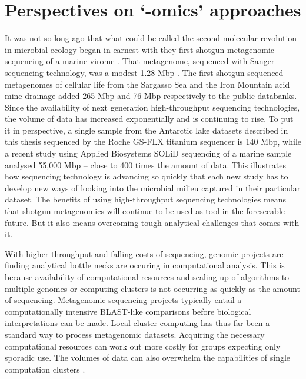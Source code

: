 \section{Perspectives on `-omics' approaches }
It was not so long ago that what could be called the second molecular revolution in microbial ecology began in earnest with they first shotgun metagenomic sequencing of a marine virome \cite{Breitbart2002}.
That metagenome, sequenced with Sanger sequencing technology, was a modest 1.28 Mbp \cite{Breitbart2002}.
The first shotgun sequenced metagenomes of cellular life from the Sargasso Sea \cite{Venter2004} and the Iron Mountain acid mine drainage \cite{Tyson2004} added 265 Mbp and 76 Mbp respectively to the public databanks.
Since the availability of next generation high-throughput sequencing technologies, the volume of data has increased exponentially and is continuing to rise.
To put it in perspective, a single sample from the Antarctic lake datasets described in this thesis sequenced by the Roche GS-FLX titanium sequencer is 140 Mbp, while a recent study using Applied Biosystems SOLiD sequencing of a marine sample \cite{Iverson2012} analysed 55,000 Mbp -- close to 400 times the amount of data.
This illustrates how sequencing technology is advancing so quickly that each new study has to develop new ways of looking into the microbial milieu captured in their particular dataset.
The benefits of using high-throughput sequencing technologies means that shotgun metagenomics will continue to be used as tool in the foreseeable future.
But it also means overcoming tough analytical challenges that comes with it.

With higher throughput and falling costs of sequencing, genomic projects are finding analytical bottle necks are occuring in computational analysis.
This is because availability of computational resources and scaling-up of algorithms to multiple genomes or computing clusters is not occurring as quickly as the amount of sequencing.
Metagenomic sequencing projects typically entail a computationally intensive \acs{BLAST}-like comparisons before biological interpretations can be made.
Local cluster computing has thus far been a standard way to process metagenomic datasets. 
Acquiring the necessary computational resources can work out more costly for groups expecting only sporadic use.
The volumes of data can also overwhelm the capabilities of single computation clusters \cite{Iverson2012}.

